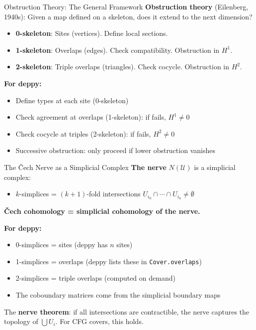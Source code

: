 \documentclass[aspectratio=169,10pt]{beamer}
\newcommand{\yes}{\textcolor{good}{\checkmark}}
\newcommand{\Uscr}{\mathcal{U}}
\begin{document}
\begin{frame}{Obstruction Theory: The General Framework}
\textbf{Obstruction theory} (Eilenberg, 1940s): Given a map defined on a skeleton, does it extend to the next dimension?

\begin{itemize}
  \item \textbf{0-skeleton}: Sites (vertices). Define local sections. \yes
  \item \textbf{1-skeleton}: Overlaps (edges). Check compatibility. Obstruction in $H^1$.
  \item \textbf{2-skeleton}: Triple overlaps (triangles). Check cocycle. Obstruction in $H^2$.
\end{itemize}

\textbf{For deppy:}
\begin{itemize}
  \item Define types at each site (0-skeleton)
  \item Check agreement at overlaps (1-skeleton): if fails, $H^1 \neq 0$
  \item Check cocycle at triples (2-skeleton): if fails, $H^2 \neq 0$
  \item Successive obstruction: only proceed if lower obstruction vanishes
\end{itemize}
\end{frame}

\begin{frame}{The \v{C}ech Nerve as a Simplicial Complex}
\textbf{The nerve} $N(\Uscr)$ is a simplicial complex:
\begin{itemize}
  \item $k$-simplices = $(k+1)$-fold intersections $U_{i_0} \cap \cdots \cap U_{i_k} \neq \emptyset$
\end{itemize}

\textbf{\v{C}ech cohomology = simplicial cohomology of the nerve.}

\vspace{0.3em}
\textbf{For deppy:}
\begin{itemize}
  \item 0-simplices = sites (deppy has $n$ sites)
  \item 1-simplices = overlaps (deppy lists these in \texttt{Cover.overlaps})
  \item 2-simplices = triple overlaps (computed on demand)
  \item The coboundary matrices come from the simplicial boundary maps
\end{itemize}

The \textbf{nerve theorem}: if all intersections are contractible, the nerve captures the topology of $\bigcup U_i$. For CFG covers, this holds.
\end{frame}
\end{document}
